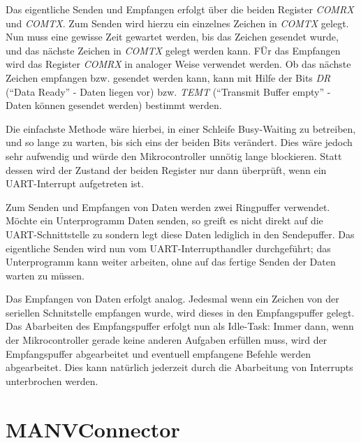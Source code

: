Das eigentliche Senden und Empfangen erfolgt über die beiden Register \textsl{COMRX} und \textsl{COMTX}.
Zum Senden wird hierzu ein einzelnes Zeichen in \textsl{COMTX} gelegt. Nun muss eine gewisse Zeit gewartet
werden, bis das Zeichen gesendet wurde, und das nächste Zeichen in \textsl{COMTX} gelegt werden kann.
FÜr das Empfangen wird das Register \textsl{COMRX} in analoger Weise verwendet werden. Ob das nächste
Zeichen empfangen bzw. gesendet werden kann, kann mit Hilfe der Bits \textsl{DR} ("`Data Ready"' - Daten liegen vor)
bzw. \textsl{TEMT} ("`Transmit Buffer empty"' - Daten können gesendet werden) bestimmt werden.

Die einfachste Methode wäre hierbei, in einer Schleife Busy-Waiting zu betreiben, und so lange zu warten,
bis sich eins der beiden Bits verändert. Dies wäre jedoch sehr aufwendig und würde den Mikrocontroller 
unnötig lange blockieren. Statt dessen wird der Zustand der beiden Register nur dann überprüft, wenn ein 
UART-Interrupt aufgetreten ist.

Zum Senden und Empfangen von Daten werden zwei Ringpuffer verwendet. Möchte ein Unterprogramm Daten senden,
so greift es nicht direkt auf die UART-Schnittstelle zu sondern legt diese Daten lediglich in den Sendepuffer.
Das eigentliche Senden wird nun vom UART-Interrupthandler durchgeführt; das Unterprogramm kann weiter arbeiten,
ohne auf das fertige Senden der Daten warten zu müssen.

Das Empfangen von Daten erfolgt analog. Jedesmal wenn ein Zeichen von der seriellen Schnitstelle empfangen
wurde, wird dieses in den Empfangspuffer gelegt. Das Abarbeiten des Empfangspuffer erfolgt nun als Idle-Task:
Immer dann, wenn der Mikrocontroller gerade keine anderen Aufgaben erfüllen muss, wird der Empfangspuffer
abgearbeitet und eventuell empfangene Befehle werden abgearbeitet. Dies kann natürlich jederzeit durch 
die Abarbeitung von Interrupts unterbrochen werden.

\section{MANVConnector}


